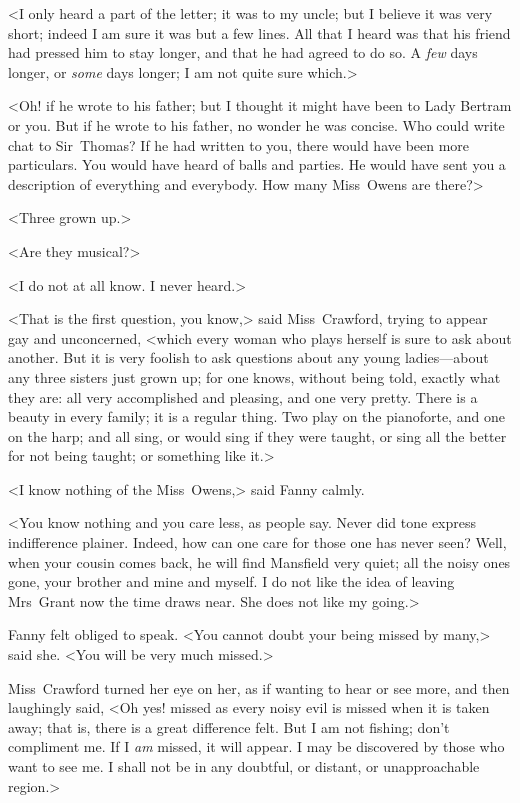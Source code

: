 <I only heard a part of the letter; it was to my uncle; but I believe it was very short; indeed I am sure it was but a few lines. All that I heard was that his friend had pressed him to stay longer, and that he had agreed to do so. A \textit{few}  days longer, or \textit{some}  days longer; I am not quite sure which.>

<Oh! if he wrote to his father; but I thought it might have been to Lady Bertram or you. But if he wrote to his father, no wonder he was concise. Who could write chat to Sir~Thomas? If he had written to you, there would have been more particulars. You would have heard of balls and parties. He would have sent you a description of everything and everybody. How many Miss~Owens are there?>

<Three grown up.>

<Are they musical?>

<I do not at all know. I never heard.>

<That is the first question, you know,> said Miss~Crawford, trying to appear gay and unconcerned, <which every woman who plays herself is sure to ask about another. But it is very foolish to ask questions about any young ladies—about any three sisters just grown up; for one knows, without being told, exactly what they are: all very accomplished and pleasing, and one very pretty. There is a beauty in every family; it is a regular thing. Two play on the pianoforte, and one on the harp; and all sing, or would sing if they were taught, or sing all the better for not being taught; or something like it.>

<I know nothing of the Miss~Owens,> said Fanny calmly.

<You know nothing and you care less, as people say. Never did tone express indifference plainer. Indeed, how can one care for those one has never seen? Well, when your cousin comes back, he will find Mansfield very quiet; all the noisy ones gone, your brother and mine and myself. I do not like the idea of leaving Mrs~Grant now the time draws near. She does not like my going.>

Fanny felt obliged to speak. <You cannot doubt your being missed by many,> said she. <You will be very much missed.>

Miss~Crawford turned her eye on her, as if wanting to hear or see more, and then laughingly said, <Oh yes! missed as every noisy evil is missed when it is taken away; that is, there is a great difference felt. But I am not fishing; don't compliment me. If I \textit{am}  missed, it will appear. I may be discovered by those who want to see me. I shall not be in any doubtful, or distant, or unapproachable region.>

